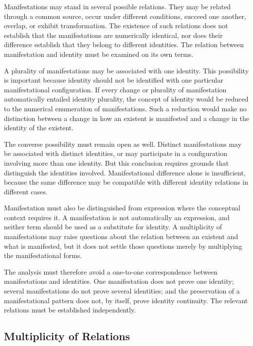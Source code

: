 Manifestations may stand in several possible relations. They may
be related through a common source, occur under different
conditions, succeed one another, overlap, or exhibit transformation.
The existence of such relations does not establish that the
manifestations are numerically identical, nor does their difference
establish that they belong to different identities. The relation
between manifestation and identity must be examined on its own
terms.

A plurality of manifestations may be associated with one identity.
This possibility is important because identity should not be
identified with one particular manifestational configuration.
If every change or plurality of manifestation automatically
entailed identity plurality, the concept of identity would be
reduced to the numerical enumeration of manifestations. Such a
reduction would make no distinction between a change in how an
existent is manifested and a change in the identity of the existent.

The converse possibility must remain open as well. Distinct
manifestations may be associated with distinct identities, or
may participate in a configuration involving more than one
identity. But this conclusion requires grounds that distinguish
the identities involved. Manifestational difference alone is
insufficient, because the same difference may be compatible with
different identity relations in different cases.

Manifestation must also be distinguished from expression where
the conceptual context requires it. A manifestation is not
automatically an expression, and neither term should be used as
a substitute for identity. A multiplicity of manifestations
may raise questions about the relation between an existent and
what is manifested, but it does not settle those questions
merely by multiplying the manifestational forms.

The analysis must therefore avoid a one-to-one correspondence
between manifestations and identities. One manifestation does
not prove one identity; several manifestations do not prove
several identities; and the preservation of a manifestational
pattern does not, by itself, prove identity continuity. The
relevant relations must be established independently.

\subsection{Multiplicity of Relations}

